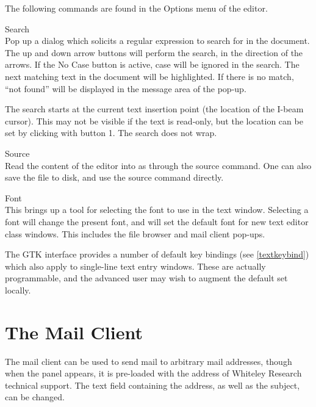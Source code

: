 The following commands are found in the {\cb Options} menu of the
editor.

\begin{description}
\item{\cb Search}\\
Pop up a dialog which solicits a regular expression to search for in
the document.  The up and down arrow buttons will perform the search,
in the direction of the arrows.  If the {\cb No Case} button is
active, case will be ignored in the search.  The next matching text in
the document will be highlighted.  If there is no match, ``not found''
will be displayed in the message area of the pop-up.

The search starts at the current text insertion point (the location of
the I-beam cursor).  This may not be visible if the text is read-only,
but the location can be set by clicking with button 1.  The search
does not wrap.

\item{\cb Source}\\
Read the content of the editor into {\WRspice} as through the {\cb
source} command.  One can also save the file to disk, and use the {\cb
source} command directly.

\item{\cb Font}\\
This brings up a tool for selecting the font to use in the text
window.  Selecting a font will change the present font, and will set
the default font for new text editor class windows.  This includes the
file browser and mail client pop-ups.
\end{description}

The GTK interface provides a number of default key bindings (see
\ref{textkeybind}) which also apply to single-line text entry windows. 
These are actually programmable, and the advanced user may wish to
augment the default set locally.


\section{The Mail Client}
\label{mailclient}


The mail client can be used to send mail to arbitrary mail addresses,
though when the panel appears, it is pre-loaded with the address of
Whiteley Research technical support.  The text field containing the
address, as well as the subject, can be changed.
    
